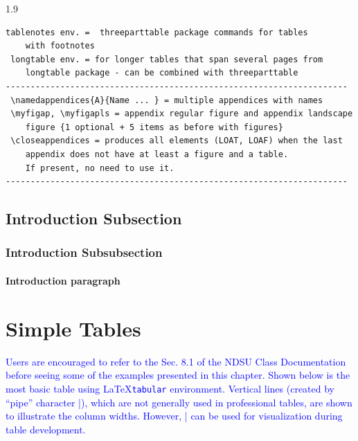 \documentclass[phd]{ndsu-thesis-2022}
\newcommand\myspacing{1.9} %
\newcommand\italk[1]{\textcolor{blue}{#1}}  %
\newcommand\lx{\LaTeX\xspace}
\begin{document}
\begin{spacing}{\myspacing}
\begin{lstlisting}[basicstyle=\ttfamily\footnotesize\color{blue}]
 tablenotes env. =  threeparttable package commands for tables 
 	with footnotes 
 longtable env. = for longer tables that span several pages from 
 	longtable package - can be combined with threeparttable 
---------------------------------------------------------------------
 \namedappendices{A}{Name ... } = multiple appendices with names 
 \myfigap, \myfigapls = appendix regular figure and appendix landscape 
 	figure {1 optional + 5 items as before with figures}
 \closeappendices = produces all elements (LOAT, LOAF) when the last 
 	appendix does not have at least a figure and a table. 
	If present, no need to use it.
---------------------------------------------------------------------
\end{lstlisting}

\subsection{Introduction Subsection}
\kant[4]

\subsubsection{Introduction Subsubsection}
\kant[6]

\paragraph{Introduction paragraph}
\kant[8]



\section{Simple Tables}

\italk{Users are encouraged to refer to the Sec. 8.1 of the NDSU Class Documentation before seeing some of the examples presented in this chapter. Shown below is the most basic table using \lx \texttt{tabular} environment. Vertical lines (created by ``pipe'' character |), which are not generally used in professional tables, are shown to illustrate the column widths. However, | can be used for visualization during table development.}


\end{spacing}
\end{document}
